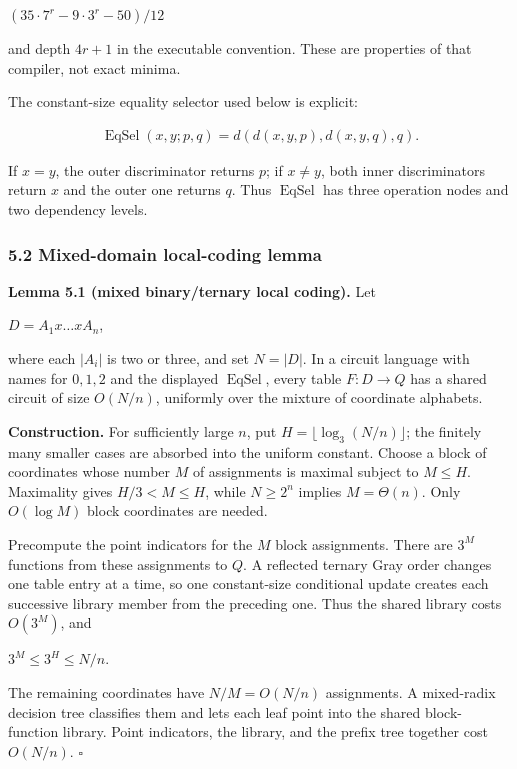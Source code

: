 \documentclass[
  11pt,
]{article}
\theoremstyle{definition}
\theoremstyle{remark}
\begin{document}
\((35\mathbin{\cdot}7^r-9\mathbin{\cdot}3^r-50)/12\)

and depth \(4r+1\) in the executable convention. These are properties of
that compiler, not exact minima.

The constant-size equality selector used below is explicit:

\[
\begin{aligned}
\operatorname{EqSel}(x,y;p,q)=d(d(x,y,p),d(x,y,q),q).
\end{aligned}
\]

If \(x=y\), the outer discriminator returns \(p\); if \(x\ne y\), both
inner discriminators return \(x\) and the outer one returns \(q\). Thus
\(\operatorname{EqSel}\) has three operation nodes and two dependency
levels.

\hypertarget{mixed-domain-local-coding-lemma}{%
\subsubsection{5.2 Mixed-domain local-coding
lemma}\label{mixed-domain-local-coding-lemma}}

\textbf{Lemma 5.1 (mixed binary/ternary local coding).} Let

\(D=A_1 x \ldots  x A_n\),

where each \(|A_i|\) is two or three, and set \(N=|D|\). In a circuit
language with names for \(0,1,2\) and the displayed
\(\operatorname{EqSel}\), every table \(F:D\to Q\) has a shared circuit
of size \(O(N/n)\), uniformly over the mixture of coordinate alphabets.

\textbf{Construction.} For sufficiently large \(n\), put
\(H=\lfloor \log_3(N/n) \rfloor\); the finitely many smaller cases are
absorbed into the uniform constant. Choose a block of coordinates whose
number \(M\) of assignments is maximal subject to \(M\le H\). Maximality
gives \(H/3<M\le H\), while \(N\ge 2^n\) implies \(M=\Theta(n)\). Only
\(O(\log M)\) block coordinates are needed.

Precompute the point indicators for the \(M\) block assignments. There
are \(3^M\) functions from these assignments to \(Q\). A reflected
ternary Gray order changes one table entry at a time, so one
constant-size conditional update creates each successive library member
from the preceding one. Thus the shared library costs \(O(3^M)\), and

\(3^M \le  3^H \le  N/n\).

The remaining coordinates have \(N/M=O(N/n)\) assignments. A mixed-radix
decision tree classifies them and lets each leaf point into the shared
block-function library. Point indicators, the library, and the prefix
tree together cost \(O(N/n)\). \(\square\)
\end{document}

